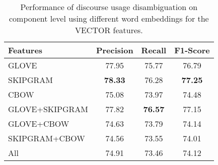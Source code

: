 \begin{table}[ht]
\centering
\begin{tabular}{|l|c|c|c|}
\hline

\bf Features        & \bf Precision & \bf Recall & \bf F1-Score \\ \hline
    GLOVE           &     77.95     &     75.77  &     76.79    \\ \hline
    SKIPGRAM        & \bf 78.33     &     76.28  & \bf 77.25    \\ \hline
    CBOW            &     75.08     &     73.97  &     74.48    \\ \hline
    GLOVE+SKIPGRAM  &     77.82     & \bf 76.57  &     77.15    \\ \hline
    GLOVE+CBOW      &     74.63     &     73.79  &     74.14    \\ \hline
    SKIPGRAM+CBOW   &     74.56     &     73.55  &     74.01    \\ \hline
    All             &     74.91     &     73.46  &     74.12    \\ \hline

\end{tabular}
\caption{\label{t:recognition-vectors} Performance of discourse usage
disambiguation on component level using different word embeddings for
the VECTOR features. }
\end{table}
